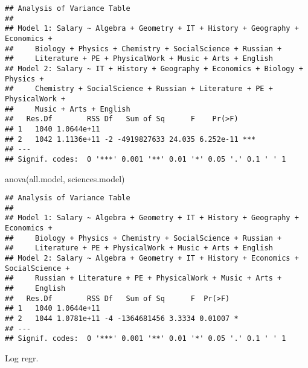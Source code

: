 \documentclass[
]{article}
\newenvironment{Shaded}{\begin{snugshade}}{\end{snugshade}}
\newcommand{\ControlFlowTok}[1]{\textcolor[rgb]{0.13,0.29,0.53}{\textbf{#1}}}
\newcommand{\DecValTok}[1]{\textcolor[rgb]{0.00,0.00,0.81}{#1}}
\newcommand{\FunctionTok}[1]{\textcolor[rgb]{0.00,0.00,0.00}{#1}}
\newcommand{\NormalTok}[1]{#1}
\newcommand{\OtherTok}[1]{\textcolor[rgb]{0.56,0.35,0.01}{#1}}
\newcommand{\SpecialCharTok}[1]{\textcolor[rgb]{0.00,0.00,0.00}{#1}}
\begin{document}
\begin{verbatim}
## Analysis of Variance Table
## 
## Model 1: Salary ~ Algebra + Geometry + IT + History + Geography + Economics + 
##     Biology + Physics + Chemistry + SocialScience + Russian + 
##     Literature + PE + PhysicalWork + Music + Arts + English
## Model 2: Salary ~ IT + History + Geography + Economics + Biology + Physics + 
##     Chemistry + SocialScience + Russian + Literature + PE + PhysicalWork + 
##     Music + Arts + English
##   Res.Df        RSS Df   Sum of Sq      F    Pr(>F)    
## 1   1040 1.0644e+11                                    
## 2   1042 1.1136e+11 -2 -4919827633 24.035 6.252e-11 ***
## ---
## Signif. codes:  0 '***' 0.001 '**' 0.01 '*' 0.05 '.' 0.1 ' ' 1
\end{verbatim}

\begin{Shaded}
\begin{Highlighting}[]
\FunctionTok{anova}\NormalTok{(all.model, sciences.model)}
\end{Highlighting}
\end{Shaded}

\begin{verbatim}
## Analysis of Variance Table
## 
## Model 1: Salary ~ Algebra + Geometry + IT + History + Geography + Economics + 
##     Biology + Physics + Chemistry + SocialScience + Russian + 
##     Literature + PE + PhysicalWork + Music + Arts + English
## Model 2: Salary ~ Algebra + Geometry + IT + History + Economics + SocialScience + 
##     Russian + Literature + PE + PhysicalWork + Music + Arts + 
##     English
##   Res.Df        RSS Df   Sum of Sq      F  Pr(>F)  
## 1   1040 1.0644e+11                                
## 2   1044 1.0781e+11 -4 -1364681456 3.3334 0.01007 *
## ---
## Signif. codes:  0 '***' 0.001 '**' 0.01 '*' 0.05 '.' 0.1 ' ' 1
\end{verbatim}

Log regr.

\begin{Shaded}
\end{Shaded}
\end{document}
